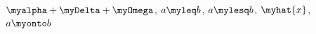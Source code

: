 \documentclass{article}
\begin{document}
$\myalpha+\myDelta+\myOmega$, $a\myleq b$, $a\mylesq b$, $\myhat{x}$, $a\myonto b$
\end{document}
